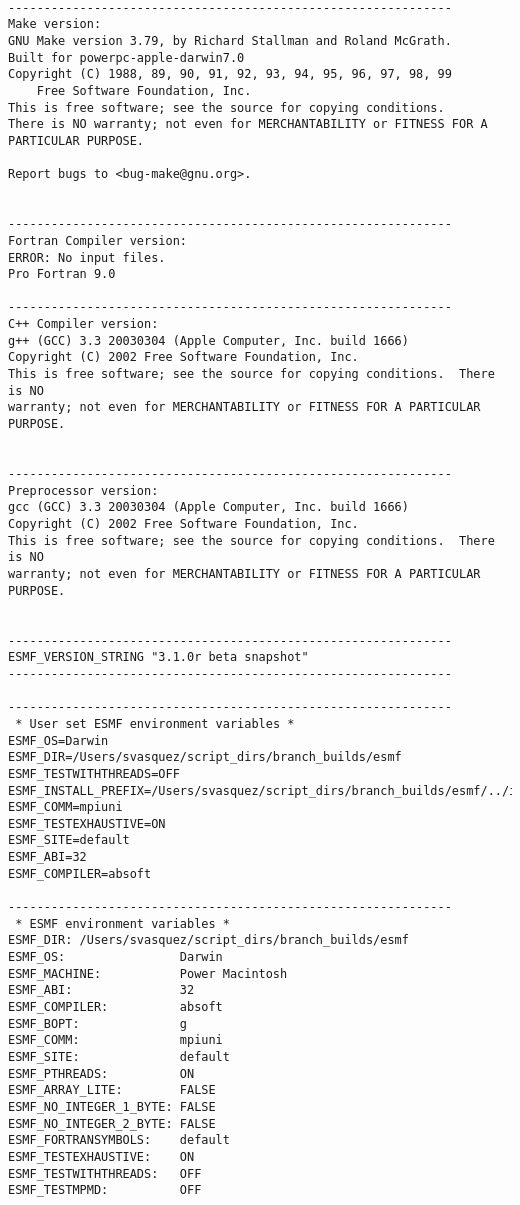 \begin{verbatim}

--------------------------------------------------------------
Make version:
GNU Make version 3.79, by Richard Stallman and Roland McGrath.
Built for powerpc-apple-darwin7.0
Copyright (C) 1988, 89, 90, 91, 92, 93, 94, 95, 96, 97, 98, 99
	Free Software Foundation, Inc.
This is free software; see the source for copying conditions.
There is NO warranty; not even for MERCHANTABILITY or FITNESS FOR A
PARTICULAR PURPOSE.

Report bugs to <bug-make@gnu.org>.


--------------------------------------------------------------
Fortran Compiler version:
ERROR: No input files.
Pro Fortran 9.0

--------------------------------------------------------------
C++ Compiler version:
g++ (GCC) 3.3 20030304 (Apple Computer, Inc. build 1666)
Copyright (C) 2002 Free Software Foundation, Inc.
This is free software; see the source for copying conditions.  There is NO
warranty; not even for MERCHANTABILITY or FITNESS FOR A PARTICULAR PURPOSE.


--------------------------------------------------------------
Preprocessor version:
gcc (GCC) 3.3 20030304 (Apple Computer, Inc. build 1666)
Copyright (C) 2002 Free Software Foundation, Inc.
This is free software; see the source for copying conditions.  There is NO
warranty; not even for MERCHANTABILITY or FITNESS FOR A PARTICULAR PURPOSE.


--------------------------------------------------------------
ESMF_VERSION_STRING "3.1.0r beta snapshot"
--------------------------------------------------------------
 
--------------------------------------------------------------
 * User set ESMF environment variables *
ESMF_OS=Darwin
ESMF_DIR=/Users/svasquez/script_dirs/branch_builds/esmf
ESMF_TESTWITHTHREADS=OFF
ESMF_INSTALL_PREFIX=/Users/svasquez/script_dirs/branch_builds/esmf/../install_dir
ESMF_COMM=mpiuni
ESMF_TESTEXHAUSTIVE=ON
ESMF_SITE=default
ESMF_ABI=32
ESMF_COMPILER=absoft
 
--------------------------------------------------------------
 * ESMF environment variables *
ESMF_DIR: /Users/svasquez/script_dirs/branch_builds/esmf
ESMF_OS:                Darwin
ESMF_MACHINE:           Power Macintosh
ESMF_ABI:               32
ESMF_COMPILER:          absoft
ESMF_BOPT:              g
ESMF_COMM:              mpiuni
ESMF_SITE:              default
ESMF_PTHREADS:          ON
ESMF_ARRAY_LITE:        FALSE
ESMF_NO_INTEGER_1_BYTE: FALSE
ESMF_NO_INTEGER_2_BYTE: FALSE
ESMF_FORTRANSYMBOLS:    default
ESMF_TESTEXHAUSTIVE:    ON
ESMF_TESTWITHTHREADS:   OFF
ESMF_TESTMPMD:          OFF
 

\end{verbatim}
